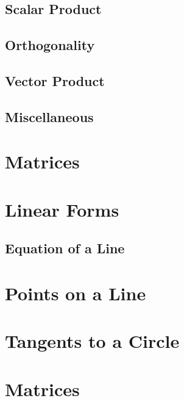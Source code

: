 \documentclass[journal]{IEEEtran}
\begin{document}
\subsection{Scalar Product}

\newpage
\subsection{Orthogonality}

\newpage
\subsection{Vector Product}

\newpage
\subsection{Miscellaneous}

\newpage
\section{Matrices}

\newpage
\section{Linear Forms}
\subsection{Equation of a Line}

\appendices
\section{Points on a Line}

\newpage
\section{Tangents to a Circle}

\section{Matrices}

\end{document}
